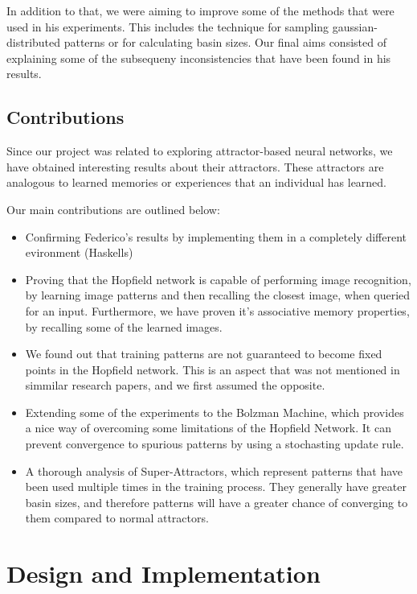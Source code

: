 \documentclass[11pt,a4paper,oneside]{report}
\begin{document}
In addition to that, we were aiming to improve some of the methods that were used in his experiments. This includes the technique for sampling gaussian-distributed patterns or for calculating basin sizes. Our final aims consisted of explaining some of the subsequeny inconsistencies that have been found in his results. 

\section{Contributions}

Since our project was related to exploring attractor-based neural networks, we have obtained interesting results about their attractors. These attractors are analogous to learned memories or experiences that an individual has learned. 


Our main contributions are outlined below:
\begin{itemize}
\item Confirming Federico's results by implementing them in a completely different evironment (Haskells)
\item Proving that the Hopfield network is capable of performing image recognition, by learning image patterns and then recalling the closest image, when queried for an input. Furthermore, we have proven it's associative memory properties, by recalling some of the learned images. 
\item We found out that training patterns are not guaranteed to become fixed points in the Hopfield network. This is an aspect that was not mentioned in simmilar research papers, and we first assumed the opposite.
\item Extending some of the experiments to the Bolzman Machine, which provides a nice way of overcoming some limitations of the Hopfield Network. It can prevent convergence to spurious patterns by using a stochasting update rule. 
\item A thorough analysis of Super-Attractors, which represent patterns that have been used multiple times in the training process. They generally have greater basin sizes, and therefore patterns will have a greater chance of converging to them compared to normal attractors. 
\end{itemize}

\chapter{Design and Implementation}
\end{document}
